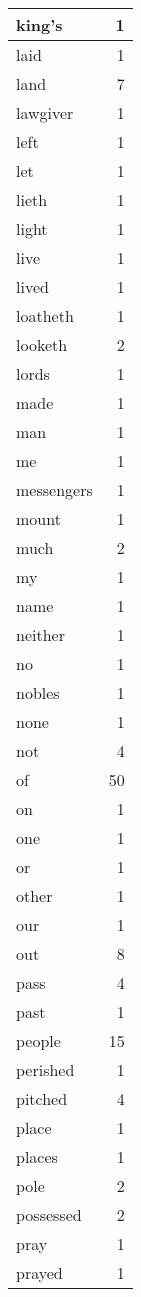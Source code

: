 \begin{center}
\begin{longtable}{l|r}
king's & 1 \\ \hline
laid & 1 \\ \hline
land & 7 \\ \hline
lawgiver & 1 \\ \hline
left & 1 \\ \hline
let & 1 \\ \hline
lieth & 1 \\ \hline
light & 1 \\ \hline
live & 1 \\ \hline
lived & 1 \\ \hline
loatheth & 1 \\ \hline
looketh & 2 \\ \hline
lords & 1 \\ \hline
made & 1 \\ \hline
man & 1 \\ \hline
me & 1 \\ \hline
messengers & 1 \\ \hline
mount & 1 \\ \hline
much & 2 \\ \hline
my & 1 \\ \hline
name & 1 \\ \hline
neither & 1 \\ \hline
no & 1 \\ \hline
nobles & 1 \\ \hline
none & 1 \\ \hline
not & 4 \\ \hline
of & 50 \\ \hline
on & 1 \\ \hline
one & 1 \\ \hline
or & 1 \\ \hline
other & 1 \\ \hline
our & 1 \\ \hline
out & 8 \\ \hline
pass & 4 \\ \hline
past & 1 \\ \hline
people & 15 \\ \hline
perished & 1 \\ \hline
pitched & 4 \\ \hline
place & 1 \\ \hline
places & 1 \\ \hline
pole & 2 \\ \hline
possessed & 2 \\ \hline
pray & 1 \\ \hline
prayed & 1 \\ \hline

\end{longtable}
\end{center}
